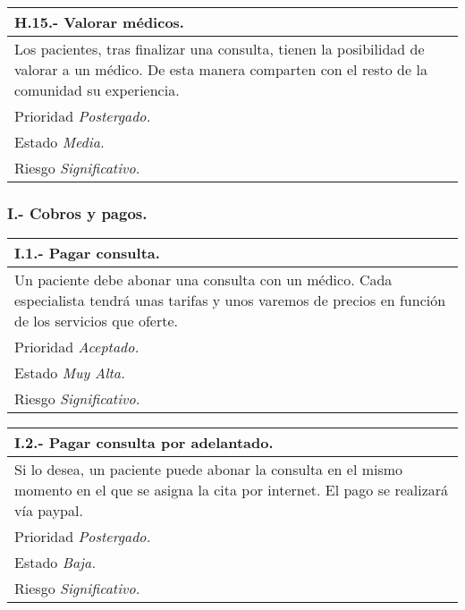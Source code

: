 \documentclass[a4paper,oneside,11pt]{book}
\begin{document}
\begin{center}
\begin{tabulary}{15cm}{|L|}
	\hline
		\bf{H.15.- Valorar médicos.} \\
	\hline
		Los pacientes, tras finalizar una consulta, tienen la posibilidad de valorar a un médico. De esta manera comparten con el resto de la comunidad su experiencia. \\
	\hline
		Prioridad \textit{Postergado.} \\
	\hline
		Estado \textit{Media.} \\
	\hline
		Riesgo \textit{Significativo.} \\
	\hline
\end{tabulary}
\end{center}


\subsubsection{I.- Cobros y pagos.}

\begin{center}
\begin{tabulary}{15cm}{|L|}
	\hline
		\bf{I.1.- Pagar consulta.} \\
	\hline
		Un paciente debe abonar una consulta con un médico. Cada especialista tendrá unas tarifas y unos varemos de precios en función de los servicios que oferte.  \\
	\hline
		Prioridad \textit{Aceptado.} \\
	\hline
		Estado \textit{Muy Alta.} \\
	\hline
		Riesgo \textit{Significativo.} \\
	\hline
\end{tabulary}
\end{center}

\begin{center}
\begin{tabulary}{15cm}{|L|}
	\hline
		\bf{I.2.- Pagar consulta por adelantado.} \\
	\hline
		Si lo desea, un paciente puede abonar la consulta en el mismo momento en el que se asigna la cita por internet. El pago se realizará vía paypal. \\
	\hline
		Prioridad \textit{Postergado.} \\
	\hline
		Estado \textit{Baja.} \\
	\hline
		Riesgo \textit{Significativo.} \\
	\hline
\end{tabulary}
\end{center}
\end{document}
